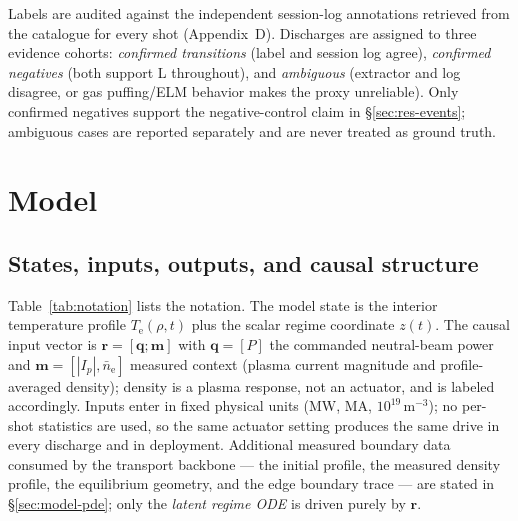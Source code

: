 \documentclass[11pt]{article}
\newcommand{\Te}{T_{\mathrm{e}}}
\newcommand{\nel}{n_{\mathrm{e}}}
\newcommand{\lat}{z}
\newcommand{\ctrlq}{\bm{q}}
\newcommand{\ctxm}{\bm{m}}
\newcommand{\inr}{\bm{r}}
\begin{document}
Labels are audited against the independent session-log annotations
retrieved from the catalogue for every shot (Appendix~D). Discharges are
assigned to three evidence cohorts: \emph{confirmed transitions} (label
and session log agree), \emph{confirmed negatives} (both support L
throughout), and \emph{ambiguous} (extractor and log disagree, or gas
puffing/ELM behavior makes the proxy unreliable). Only confirmed
negatives support the negative-control claim in
\S\ref{sec:res-events}; ambiguous cases are reported separately and are
never treated as ground truth.

\section{Model}
\label{sec:model}

\subsection{States, inputs, outputs, and causal structure}
\label{sec:model-io}

Table~\ref{tab:notation} lists the notation. The model state is the
interior temperature profile $\Te(\rho, t)$ plus the scalar regime
coordinate $\lat(t)$. The causal input vector is
$\inr = [\ctrlq; \ctxm]$ with $\ctrlq = [P]$ the commanded neutral-beam
power and $\ctxm = [|I_p|, \bar\nel]$ measured context (plasma current
magnitude and profile-averaged density); density is a plasma response, not
an actuator, and is labeled accordingly. Inputs enter in fixed physical
units (MW, MA, $10^{19}\,$m$^{-3}$); no per-shot statistics are used, so
the same actuator setting produces the same drive in every discharge and
in deployment. Additional measured boundary data consumed by the transport
backbone --- the initial profile, the measured density profile, the
equilibrium geometry, and the edge boundary trace --- are stated in
\S\ref{sec:model-pde}; only the \emph{latent regime ODE} is driven purely
by $\inr$.
\end{document}
